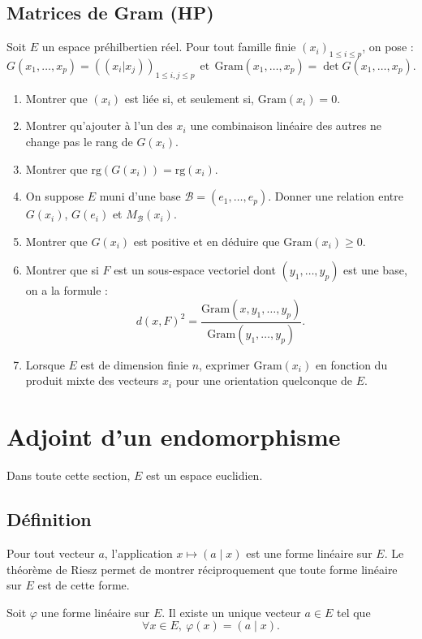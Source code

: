 \documentclass[french]{article}
\newcommand{\rg}{\text{rg}}
\theoremstyle{plain}
\theoremstyle{definition}
\theoremstyle{remark}
\begin{document}
\subsection{Matrices de Gram (HP)}

Soit $E$ un espace préhilbertien réel. Pour tout famille finie $(x_i)_{1\leqslant i\leqslant p}$, on pose : $$G(x_1,\ldots,x_p)=((x_i|x_j))_{1\leqslant i,j\leqslant p}\ \ \text{et} \ \ \text{Gram}(x_1,\ldots,x_p)=\det G(x_1,\ldots,x_p).$$
\begin{enumerate}
	\item Montrer que $(x_i)$ est liée si, et seulement si, $\text{Gram}(x_i)=0$.
	\item Montrer qu'ajouter à l'un des $x_i$ une combinaison linéaire des autres ne change pas le rang de $G(x_i)$.
	\item Montrer que $\rg(G(x_i))=\rg (x_i)$.
	\item On suppose $E$ muni d'une base $\mathcal{B}=(e_1,\ldots,e_p)$. Donner une relation entre $G(x_i)$, $G(e_i)$ et $M_\mathcal{B}(x_i)$.
	\item Montrer que $G(x_i)$ est positive et en déduire que $\text{Gram}(x_i)\geqslant0$.
	\item Montrer que si $F$ est un sous-espace vectoriel dont $(y_1,\ldots, y_p)$ est une base, on a la formule : $$d(x,F)^2=\frac{\text{Gram}(x,y_1,\ldots,y_p)}{\text{Gram}(y_1,\ldots,y_p)}.$$
	\item Lorsque $E$ est de dimension finie $n$, exprimer $\text{Gram}(x_i)$ en fonction du produit mixte des vecteurs $x_i$ pour une orientation quelconque de $E$.
\end{enumerate}

\section{Adjoint d'un endomorphisme}

Dans toute cette section, $E$ est un espace euclidien.

\subsection{Définition}

Pour tout vecteur $a$, l'application $x\mapsto (a\mid x)$ est une forme linéaire sur $E$. Le théorème de Riesz permet de montrer réciproquement que toute forme linéaire sur $E$ est de cette forme.

\begin{thm}
	Soit $\varphi$ une forme linéaire sur $E$. Il existe un unique vecteur $a\in E$ tel que $$\forall x\in E,\ \varphi(x)=(a\mid x).$$
\end{thm}
\end{document}
